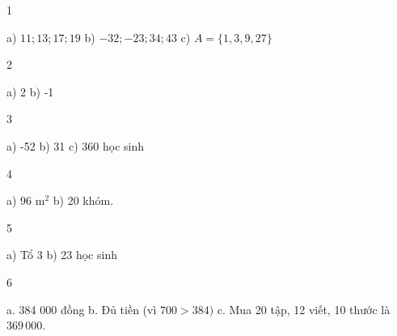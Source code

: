 \begin{Solbook}{1}
 \par \noindent a) $11; 13; 17; 19$ \hfill b) $-32;-23; 34; 43 $ \hfill c) $A = \{1, 3, 9, 27\}$ \hfill \qedEX 
\end{Solbook}
\begin{Solbook}{2}
 \par \noindent a) 2 \hfill b) -1 \hfill \qedEX 
\end{Solbook}
\begin{Solbook}{3}
 \par \noindent a) -52 \hfill b) 31 \hfill c) 360 học sinh \hfill \qedEX 
\end{Solbook}
\begin{Solbook}{4}
 \par \noindent a) 96 m$^2$ \hfill b) 20 khóm. \hfill \qedEX 
\end{Solbook}
\begin{Solbook}{5}
 \par \noindent a) Tổ 3 \hfill b) 23 học sinh \hfill \qedEX 
\end{Solbook}
\begin{Solbook}{6}
 \par \noindent a. 384 000 đồng \hfill b. Đủ tiền (vì $700>384)$ \hfill c. Mua 20 tập, 12 viết, 10 thước là $369\,000$. \hfill \qedEX 
\end{Solbook}
